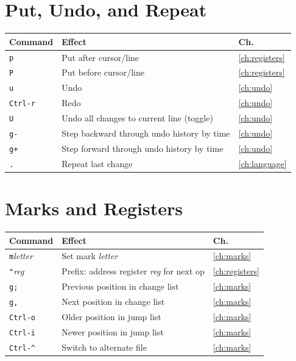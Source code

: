 \section{Put, Undo, and Repeat}

\begin{longtable}{@{}l p{9cm} l@{}}
\textbf{Command} & \textbf{Effect} & \textbf{Ch.} \\
\hline
\endhead
\texttt{p} & Put after cursor/line & \ref{ch:registers} \\
\texttt{P} & Put before cursor/line & \ref{ch:registers} \\
\texttt{u} & Undo & \ref{ch:undo} \\
\texttt{Ctrl-r} & Redo & \ref{ch:undo} \\
\texttt{U} & Undo all changes to current line (toggle) & \ref{ch:undo} \\
\texttt{g-} & Step backward through undo history by time & \ref{ch:undo} \\
\texttt{g+} & Step forward through undo history by time & \ref{ch:undo} \\
\texttt{.} & Repeat last change & \ref{ch:language} \\
\end{longtable}

\section{Marks and Registers}

\begin{longtable}{@{}l p{9cm} l@{}}
\textbf{Command} & \textbf{Effect} & \textbf{Ch.} \\
\hline
\endhead
\texttt{m}\textit{letter} & Set mark \textit{letter} & \ref{ch:marks} \\
\texttt{"}\textit{reg} & Prefix: address register \textit{reg} for next op & \ref{ch:registers} \\
\texttt{g;} & Previous position in change list & \ref{ch:marks} \\
\texttt{g,} & Next position in change list & \ref{ch:marks} \\
\texttt{Ctrl-o} & Older position in jump list & \ref{ch:marks} \\
\texttt{Ctrl-i} & Newer position in jump list & \ref{ch:marks} \\
\texttt{Ctrl-\textasciicircum} & Switch to alternate file & \ref{ch:marks} \\
\end{longtable}

